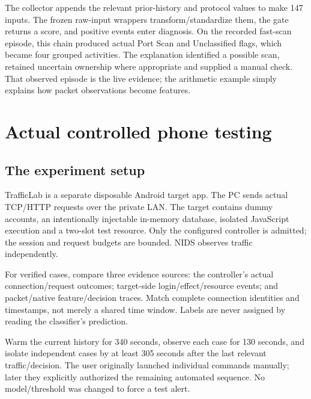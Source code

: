 \documentclass[11pt,a4paper,oneside]{report}
\begin{document}
The collector appends the relevant prior-history and protocol values to make 147 inputs. The frozen raw-input wrappers transform/standardize them, the gate returns a score, and positive events enter diagnosis. On the recorded fast-scan episode, this chain produced actual Port Scan and Unclassified flags, which became four grouped activities. The explanation identified a possible scan, retained uncertain ownership where appropriate and supplied a manual check. That observed episode is the live evidence; the arithmetic example simply explains how packet observations become features.

\chapter{Actual controlled phone testing}
\section{The experiment setup}
TrafficLab is a separate disposable Android target app. The PC sends actual TCP/HTTP requests over the private LAN. The target contains dummy accounts, an intentionally injectable in-memory database, isolated JavaScript execution and a two-slot test resource. Only the configured controller is admitted; the session and request budgets are bounded. NIDS observes traffic independently.

For verified cases, compare three evidence sources: the controller's actual connection/request outcomes; target-side login/effect/resource events; and packet/native feature/decision traces. Match complete connection identities and timestamps, not merely a shared time window. Labels are never assigned by reading the classifier's prediction.

Warm the current history for 340 seconds, observe each case for 130 seconds, and isolate independent cases by at least 305 seconds after the last relevant traffic/decision. The user originally launched individual commands manually; later they explicitly authorized the remaining automated sequence. No model/threshold was changed to force a test alert.
\end{document}
